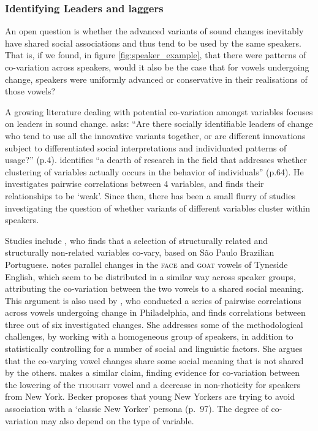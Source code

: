 \documentclass[review]{elsarticle} %
\begin{document}
\subsubsection{Identifying Leaders and laggers}

An open question is whether the advanced variants of sound changes inevitably have shared social associations and thus tend to be used by the same speakers.  That is, if we found, in figure \ref{fig:speaker_example},  that there were patterns of co-variation across speakers, would it also be the case that for vowels undergoing change, speakers were uniformly advanced or conservative in their realisations of those vowels?

A growing literature dealing with potential co-variation amongst variables focuses on leaders in sound change. \cite{guy2016linguistic} asks: ``Are there socially identifiable leaders of change who tend to use all the innovative variants together, or are different innovations subject to differentiated social interpretations and individuated patterns of usage?'' (p.4). \cite{guy2013cognitive} identifies ``a dearth of research in the field that addresses whether clustering of variables actually occurs in the behavior of individuals'' (p.64).  He investigates pairwise correlations between 4 variables, and finds their relationships to be `weak'.  Since then, there has been a small flurry of studies investigating the question of whether variants of different variables cluster within speakers.

Studies include \cite{oushiro2016social}, who finds that a selection of structurally related and structurally non-related variables co-vary, based on São Paulo Brazilian Portuguese. \cite{watt2000phonetic} notes parallel changes in the \textsc{face} and \textsc{goat} vowels of Tyneside English, which seem to be distributed in a similar way across speaker groups, attributing the co-variation between the two vowels to a shared social meaning. This argument is also used by \cite{tamminga2019interspeaker}, who conducted a series of pairwise correlations across vowels undergoing change in Philadelphia, and finds correlations between three out of six investigated changes.  She addresses some of the methodological challenges, by working with a homogeneous group of speakers, in addition to statistically controlling for a number of social and linguistic factors. She argues that the co-varying vowel changes share some social meaning that is not shared by the others. \cite{becker2016linking} makes a similar claim, finding evidence for co-variation between the lowering of the \textsc{thought} vowel and a decrease in non-rhoticity for speakers from New York.  Becker proposes that young New Yorkers are trying to avoid association with a `classic New Yorker' persona (p.\ 97).  
The degree of co-variation may also depend on the type of variable.
\end{document}
